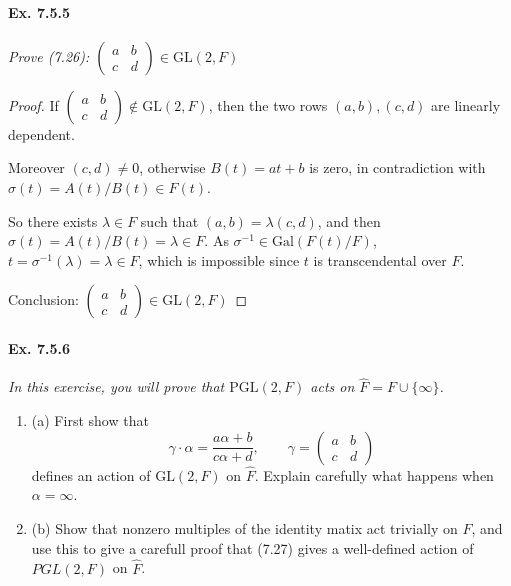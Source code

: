 \documentclass[11pt,a4paper]{article}
\newcommand{\be} {\begin{enumerate}}
\newcommand{\ee} {\end{enumerate}}
\newcommand{\Gal}{\mathrm{Gal}}
\begin{document}
\paragraph{Ex. 7.5.5}

{\it Prove (7.26): 
$\left(
\begin{array}{cc}
 a &  b\\
 c &   d  
\end{array}
\right)
 \in \mathrm{GL}(2,F)$
}

\begin{proof}

If $\left(
\begin{array}{cc}
 a &  b\\
 c &   d  
\end{array}
\right)
\not \in \mathrm{GL}(2,F)$, then the two rows $(a,b),(c,d)$ are linearly dependent. 

Moreover $(c,d) \neq 0$, otherwise $B(t) =a t +b$ is zero, in contradiction with $\sigma(t) = A(t)/B(t) \in F(t)$.

So there exists $\lambda \in F$ such that $(a,b) = \lambda (c,d)$, and then $\sigma(t) = A(t)/B(t)  = \lambda \in F$. As $\sigma^{-1} \in \Gal(F(t)/F)$, $t = \sigma^{-1}(\lambda) = \lambda \in F$, which is impossible since $t$ is transcendental over $F$.

Conclusion: $\left(
\begin{array}{cc}
 a &  b\\
 c &   d  
\end{array}
\right)
 \in \mathrm{GL}(2,F)$
\end{proof}

\paragraph{Ex. 7.5.6}

{\it In this exercise, you will prove that $\mathrm{PGL}(2,F)$ acts on $\hat{F} = F \cup \{\infty\}$.
\be
\item[(a)] First show that
$$\gamma \cdot \alpha = \frac{a\alpha + b}{c\alpha + d}, \qquad \gamma = 
\left(
\begin{array}{cc}
 a&   b   \\
 c&   d   
\end{array}
\right)
$$
defines an action of $\mathrm{GL}(2,F)$ on $\hat{F}$. Explain carefully what happens when $\alpha = \infty$.
\item[(b)] Show that nonzero multiples of the identity matix act trivially on $\hat{F}$, and use this to give a carefull proof that (7.27) gives a well-defined action of $PGL(2,F)$ on $\hat{F}$.
\ee
}
\end{document}
